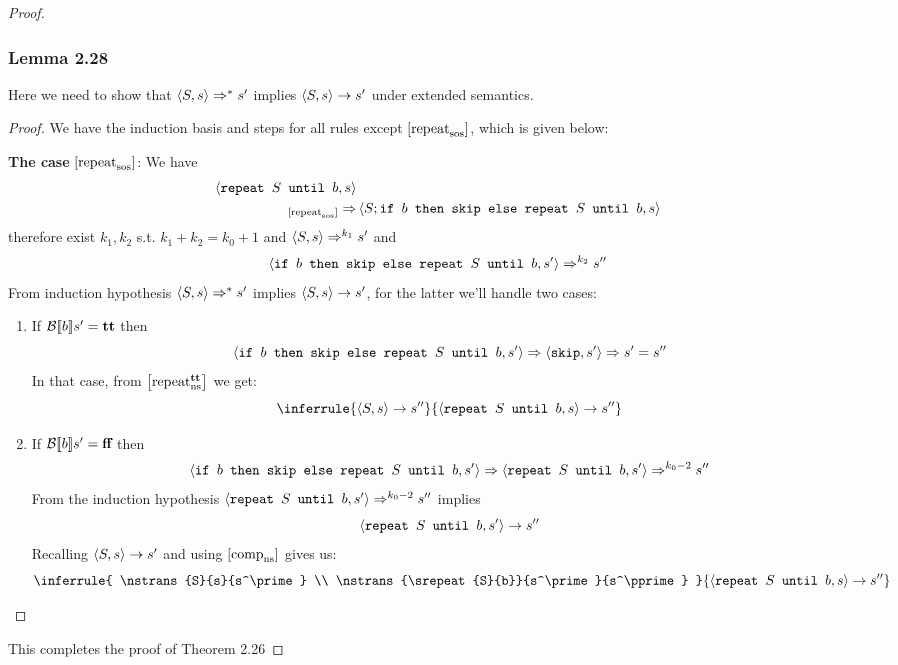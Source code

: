 \begin{proof}
\subsubsection*{Lemma 2.28}
Here we need to show that $\sosftrans[*]{S}{s}{s^\prime}$ implies $\nstrans{S}{s}{s^\prime}$ under extended semantics.
\begin{proof}
We have the induction basis and steps for all rules except $\sosrule{repeat}$, which is given below:

\textbf{The case} $\sosrule{repeat}$: We have
\begin{align*}
	\state{\srepeat{S}{b}}{s} & \\
	{}_{\sosrule{repeat}} \Rightarrow & \state{S;\sif{b}{\sskip}{\srepeat{S}{b}}}{s} 
\end{align*}
therefore exist $k_1,k_2$ s.t. $k_1+k_2=k_0+1$ and $\sosftrans[k_1]{S}{s}{s^\prime}$ and
\begin{equation*}
	\sosftrans[k_2]{\sif{b}{\sskip}{\srepeat{S}{b}}}{s^\prime}{s^\pprime}
\end{equation*}
From induction hypothesis $\sosftrans[*]{S}{s}{s^\prime}$ implies $\nstrans{S}{s}{s^\prime}$, for the latter we'll handle two cases:
\begin{enumerate}
	\item If $\beval{b}{s^\prime}=\true$ then
	\begin{equation*}
		\state{\sif{b}{\sskip}{\srepeat{S}{b}}}{s^\prime} \Rightarrow \state{\sskip}{s^\prime}\Rightarrow s^\prime=s^\pprime
	\end{equation*}
	In that case, from $\nsrule[\true]{repeat}$ we get:
	\begin{equation*}
	\inferrule
		{\nstrans{S}{s}{s^\pprime}}
		{\nstrans{\srepeat{S}{b}}{s}{s^\pprime}}
	\end{equation*}
	\item If $\beval{b}{s^\prime}=\false$ then
	\begin{equation*}
		\state{\sif{b}{\sskip}{\srepeat{S}{b}}}{s^\prime} \Rightarrow \state{\srepeat{S}{b}}{s^\prime}\Rightarrow^{k_0-2} s^\pprime
	\end{equation*}
	From the induction hypothesis $\state{\srepeat{S}{b}}{s^\prime}\Rightarrow^{k_0-2} s^\pprime$ implies
	\begin{equation*}
		\nstrans{\srepeat{S}{b}}{s^\prime}{s^\pprime}
	\end{equation*}
	Recalling $\nstrans{S}{s}{s^\prime}$ and using $\nsrule{comp}$ gives us:
	\begin{equation*}
		\inferrule
			{
				\nstrans{S}{s}{s^\prime} \\
				\nstrans{\srepeat{S}{b}}{s^\prime}{s^\pprime}
			}
			{\nstrans{\srepeat{S}{b}}{s}{s^\pprime}}
	\end{equation*}
\end{enumerate}

\end{proof}
This completes the proof of Theorem 2.26
\end{proof}